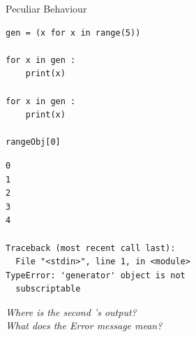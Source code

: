 \begin{frame}[fragile]{Peculiar Behaviour}
%
\begin{tcbraster}[raster columns=2,
                  raster equal height,
                  nobeforeafter,
                  raster column skip=0.5cm]
\begin{codebox}
\begin{verbatim}
gen = (x for x in range(5))

for x in gen :
    print(x)

for x in gen :
    print(x)

rangeObj[0]
\end{verbatim}
\end{codebox}
%
\begin{cmdbox}
\begin{verbatim}
0
1
2
3
4

Traceback (most recent call last):
  File "<stdin>", line 1, in <module>
TypeError: 'generator' object is not
  subscriptable

\end{verbatim}
\end{cmdbox}
\end{tcbraster}
%
\begin{center}
\emph{
	Where is the second 's output?\\
	What does the Error message mean?
}
\end{center}
%
\end{frame}


